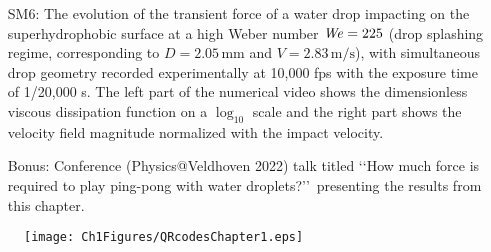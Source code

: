 \begin{subappendices}
\begin{enumerate}
		\item[SM6:] The evolution of the transient force of a water drop impacting on the superhydrophobic surface at a high Weber number $\mathit{We} = 225$ (drop splashing regime, corresponding to $D = 2.05\,\si{\milli\meter}$ and $V = 2.83\,\si{\meter}/\si{\second}$), with simultaneous drop geometry recorded experimentally at 10,000 fps with the exposure time of 1/20,000 s. The left part of the numerical video shows the dimensionless viscous dissipation function on a $\log_{10}$ scale and the right part shows the velocity field magnitude normalized with the impact velocity.
		\item[Bonus:] Conference (Physics@Veldhoven 2022) talk titled \lq\lq How much force is required to play ping-pong with water droplets?\rq\rq\, presenting the results from this chapter. 
	\end{enumerate}

	\begin{figure*}
		\centering
		\texttt{[image: Ch1Figures/QRcodesChapter1.eps]}
	\end{figure*}

\end{subappendices}